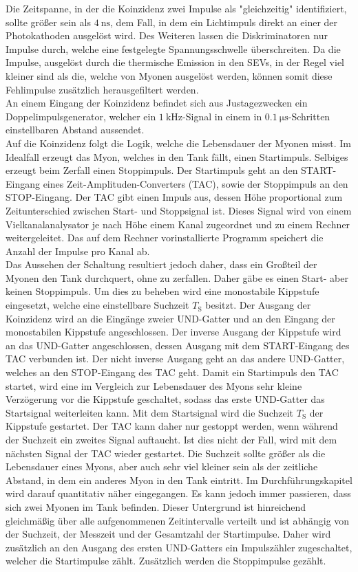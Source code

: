 Die Zeitspanne, in der die Koinzidenz zwei Impulse als "gleichzeitig" identifiziert, sollte größer sein als $\SI{4}{\nano\second}$, dem Fall, in dem ein Lichtimpuls direkt an einer der Photokathoden ausgelöst wird.
Des Weiteren lassen die Diskriminatoren nur Impulse durch, welche eine festgelegte Spannungsschwelle überschreiten.
Da die Impulse, ausgelöst durch die thermische Emission in den SEVs, in der Regel viel kleiner sind als die, welche von Myonen ausgelöst werden, können somit diese Fehlimpulse zusätzlich herausgefiltert werden.\\
An einem Eingang der Koinzidenz befindet sich aus Justagezwecken ein Doppelimpulsgenerator, welcher ein $\SI{1}{\kilo\hertz}$-Signal in einem in $\SI{0,1}{\micro\second}$-Schritten einstellbaren Abstand aussendet.\\
Auf die Koinzidenz folgt die Logik, welche die Lebensdauer der Myonen misst.
Im Idealfall erzeugt das Myon, welches in den Tank fällt, einen Startimpuls.
Selbiges erzeugt beim Zerfall einen Stoppimpuls.
Der Startimpuls geht an den START-Eingang eines Zeit-Amplituden-Converters (TAC), sowie der Stoppimpuls an den STOP-Eingang.
Der TAC gibt einen Impuls aus, dessen Höhe proportional zum Zeitunterschied zwischen Start- und Stoppsignal ist.
Dieses Signal wird von einem Vielkanalanalysator je nach Höhe einem Kanal zugeordnet und zu einem Rechner weitergeleitet.
Das auf dem Rechner vorinstallierte Programm speichert die Anzahl der Impulse pro Kanal ab.\\
Das Aussehen der Schaltung resultiert jedoch daher, dass ein Großteil der Myonen den Tank durchquert, ohne zu zerfallen.
Daher gäbe es einen Start- aber keinen Stoppimpuls.
Um dies zu beheben wird eine monostabile Kippstufe eingesetzt, welche eine einstellbare Suchzeit $T_\text{S}$ besitzt.
Der Ausgang der Koinzidenz wird an die Eingänge zweier UND-Gatter und an den Eingang der monostabilen Kippstufe angeschlossen.
Der inverse Ausgang der Kippstufe wird an das UND-Gatter angeschlossen, dessen Ausgang mit dem START-Eingang des TAC verbunden ist.
Der nicht inverse Ausgang geht an das andere UND-Gatter, welches an den STOP-Eingang des TAC geht.
Damit ein Startimpuls den TAC startet, wird eine im Vergleich zur Lebensdauer des Myons sehr kleine Verzögerung vor die Kippstufe geschaltet, sodass das erste UND-Gatter das Startsignal weiterleiten kann.
Mit dem Startsignal wird die Suchzeit $T_\text{S}$ der Kippstufe gestartet.
Der TAC kann daher nur gestoppt werden, wenn während der Suchzeit ein zweites Signal auftaucht.
Ist dies nicht der Fall, wird mit dem nächsten Signal der TAC wieder gestartet.
Die Suchzeit sollte größer als die Lebensdauer eines Myons, aber auch sehr viel kleiner sein als der zeitliche Abstand, in dem ein anderes Myon in den Tank eintritt.
Im Durchführungskapitel wird darauf quantitativ näher eingegangen.
Es kann jedoch immer passieren, dass sich zwei Myonen im Tank befinden.
Dieser Untergrund ist hinreichend gleichmäßig über alle aufgenommenen Zeitintervalle verteilt und ist abhängig von der Suchzeit, der Messzeit und der Gesamtzahl der Startimpulse.
Daher wird zusätzlich an den Ausgang des ersten UND-Gatters ein Impulszähler zugeschaltet, welcher die Startimpulse zählt.
Zusätzlich werden die Stoppimpulse gezählt.
